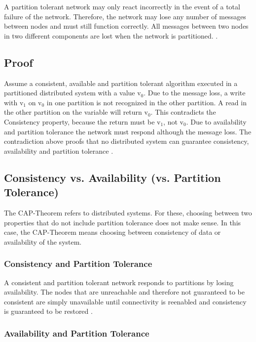 A partition tolerant network may only react incorrectly in the event of a total failure of the network. Therefore, the network may lose any number of messages between nodes and must still function correctly. All messages between two nodes in two different components are lost when the network is partitioned. \parencite[3\psqq]{brewer:2002}.

\subsection{Proof}

Assume a consistent, available and partition tolerant algorithm executed in a partitioned distributed system with a value v$_{0}$. Due to the message loss, a write with v$_{1}$ on v$_{0}$ in one partition is not recognized in the other partition. A read in the other partition on the variable will return v$_{0}$. This contradicts the Consistency property, because the return must be v$_{1}$, not v$_{0}$. Due to availability and partition tolerance the network must respond although the message loss. The contradiction above proofs that no distributed system can guarantee consistency, availability and partition tolerance \parencite[4\psqq]{brewer:2002}.

\subsection*{Consistency vs. Availability (vs. Partition Tolerance)}

The \ac{CAP}-Theorem refers to distributed systems. For these, choosing between two properties that do not include partition tolerance does not make sense. In this case, the \ac{CAP}-Theorem means choosing between consistency of data or availability of the system.

\subsubsection*{Consistency and Partition Tolerance}

A consistent and partition tolerant network responds to partitions by losing availability. The nodes that are unreachable and therefore not guaranteed to be consistent are simply unavailable until connectivity is reenabled and consistency is guaranteed to be restored \parencite[6]{brewer:2002}.

\subsubsection*{Availability and Partition Tolerance}


